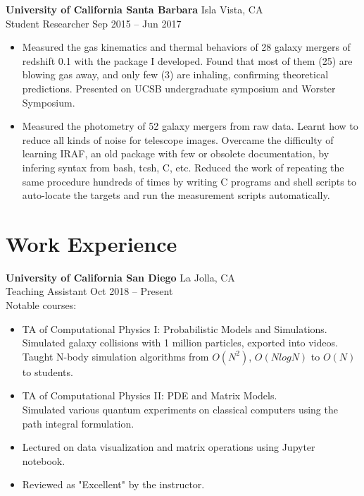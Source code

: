 \documentclass[letterpaper,12pt]{article}
\newenvironment{zitemize}{
\begin{itemize} \vspace{-.9em}\itemsep 0pt \parskip 0pt}
{\end{itemize}\vspace{-.5em}}
\begin{document}
\textbf{University of California Santa Barbara} \hfill Isla Vista, CA \\
Student Researcher \hfill Sep 2015 -- Jun 2017 \\
\begin{zitemize}
    \item Measured the gas kinematics and thermal behaviors of 28 galaxy mergers of redshift 0.1 with the package I developed. Found that most of them (25) are blowing gas away, and only few (3) are inhaling, confirming theoretical predictions. Presented on UCSB undergraduate symposium and Worster Symposium.
    \item Measured the photometry of 52 galaxy mergers from raw data. Learnt how to reduce all kinds of noise for telescope images. Overcame the difficulty of learning IRAF, an old package with few or obsolete documentation, by infering syntax from bash, tcsh, C, etc. Reduced the work of repeating the same procedure hundreds of times by writing C programs and shell scripts to auto-locate the targets and run the measurement scripts automatically.
\end{zitemize}



\section{Work Experience}

\textbf{University of California San Diego} \hfill La Jolla, CA \\
Teaching Assistant \hfill Oct 2018 -- Present \\
Notable courses:
\begin{zitemize}
    \item TA of Computational Physics I: Probabilistic Models and Simulations. \\
    Simulated galaxy collisions with 1 million particles, exported into videos. \\
    Taught N-body simulation algorithms from $O(N^2)$, $O(NlogN)$ to $O(N)$ to students.
    \item TA of Computational Physics II: PDE and Matrix Models. \\
    Simulated various quantum experiments on classical computers using the path integral formulation.
    \item Lectured on data visualization and matrix operations using Jupyter notebook.
    \item Reviewed as "Excellent" by the instructor.
\end{zitemize}
\end{document}
